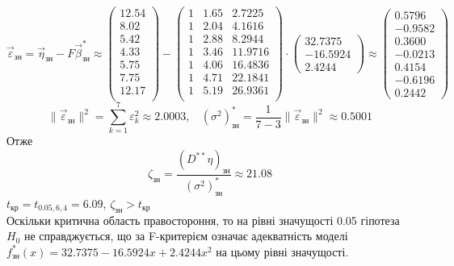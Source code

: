 \documentclass[12 pt]{article}
\begin{document}
$$
\vec{\varepsilon}_{\text{зн}} = \vec{\eta}_{\text{зн}} - F \vec{\beta}^*_{\text{зн}} \approx
\begin{pmatrix}12.54 \\8.02 \\5.42 \\4.33 \\5.75 \\7.75 \\12.17 \\\end{pmatrix}
- 
\begin{pmatrix}1 &1.65 &2.7225 \\
    1 &2.04 &4.1616 \\
    1 &2.88 &8.2944 \\
    1 &3.46 &11.9716 \\
    1 &4.06 &16.4836 \\
    1 &4.71 &22.1841 \\
    1 &5.19 &26.9361 \\
\end{pmatrix}
\cdot
\begin{pmatrix}
    32.7375 \\ 
    -16.5924 \\ 
    2.4244 
\end{pmatrix}
\approx
\begin{pmatrix}0.5796\\-0.9582\\0.3600\\-0.0213\\0.4154\\-0.6196\\0.2442 \end{pmatrix}
$$
$$
\| \vec{\varepsilon}_{\text{зн}} \|^2 = \sum_{k=1}^7 \varepsilon_k^2 \approx 2.0003, \ \ \ \ 
(\sigma^2)^*_{\text{зн}} = \frac{1}{7-3} \| \vec{\varepsilon}_{\text{зн}} \|^2  \approx 0.5001
$$
Отже
$$
\zeta_{\text{зн}} = \frac{(D^{**} \eta)_{\text{зн}}}{(\sigma^2)^*_{\text{зн}}} \approx 21.08
$$
$t_{\text{кр}} = t_{0.05, 6, 4} = 6.09$, $\zeta_{\text{зн}} > t_{\text{кр}}$ \\ 
Оскільки критична область правостороння, то на рівні значущості 0.05 гіпотеза $H_0$
не справджується, що за F-критерієм означає адекватність моделі
 $f_{\text{зн}}^*(x) = 32.7375 - 16.5924x + 2.4244x^2$ на цьому рівні значущості.   
\end{document}
